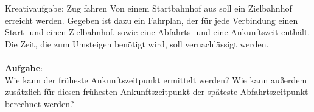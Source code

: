 \begin{frame}{Kreativaufgabe: Zug fahren}
	Von einem Startbahnhof aus soll ein Zielbahnhof erreicht werden.
	Gegeben ist dazu ein Fahrplan, der für jede Verbindung einen Start- und einen Zielbahnhof, sowie eine Abfahrts- und eine Ankunftszeit enthält.
	Die Zeit, die zum Umsteigen benötigt wird, soll vernachlässigt werden. \\ \ \\

	\textbf{Aufgabe}:\\ Wie kann der früheste Ankunftszeitpunkt ermittelt werden? Wie kann außerdem zusätzlich für diesen frühesten Ankunftszeitpunkt der späteste Abfahrtszeitpunkt berechnet werden?
\end{frame}

